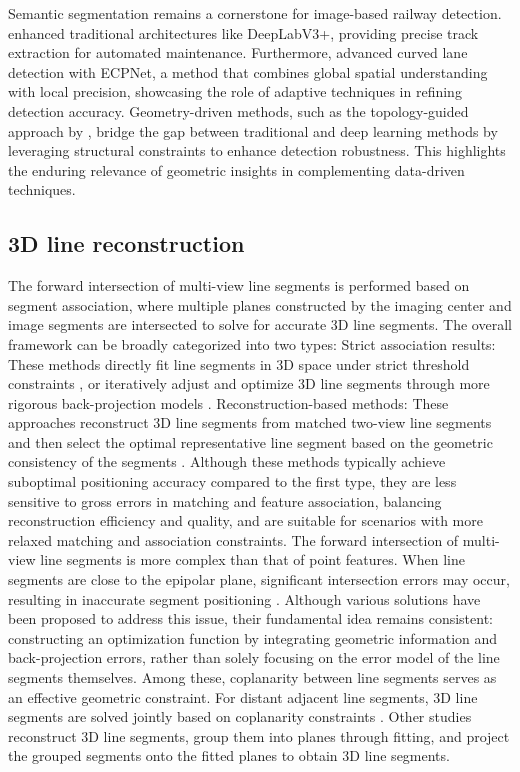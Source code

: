 Semantic segmentation remains a cornerstone for image-based railway detection.
\cite{Weng2023} enhanced traditional architectures like DeepLabV3+, providing precise track extraction for automated maintenance. Furthermore,
\cite{zhang2024enhanced} advanced curved lane detection with ECPNet, a method that combines global spatial understanding with local precision, showcasing the role of adaptive techniques in refining detection accuracy.
Geometry-driven methods, such as the topology-guided approach by \cite{Yang2022a}, bridge the gap between traditional and deep learning methods by leveraging structural constraints to enhance detection robustness. 
This highlights the enduring relevance of geometric insights in complementing data-driven techniques.

\subsection{3D line reconstruction}
The forward intersection of multi-view line segments is performed based on segment association, where multiple planes constructed by the imaging center and image segments are intersected to solve for accurate 3D line segments. The overall framework can be broadly categorized into two types:
Strict association results: These methods directly fit line segments in 3D space under strict threshold constraints \citep{Jain2010}, or iteratively adjust and optimize 3D line segments through more rigorous back-projection models \citep{Schmid1997, HOFER, LiuCVPR}.
Reconstruction-based methods: These approaches reconstruct 3D line segments from matched two-view line segments and then select the optimal representative line segment based on the geometric consistency of the segments \citep{WEI2022}. Although these methods typically achieve suboptimal positioning accuracy compared to the first type, they are less sensitive to gross errors in matching and feature association, balancing reconstruction efficiency and quality, and are suitable for scenarios with more relaxed matching and association constraints.
The forward intersection of multi-view line segments is more complex than that of point features. When line segments are close to the epipolar plane, significant intersection errors may occur, resulting in inaccurate segment positioning \citep{Hartley2003}. Although various solutions have been proposed to address this issue, their fundamental idea remains consistent: constructing an optimization function by integrating geometric information and back-projection errors, rather than solely focusing on the error model of the line segments themselves. Among these, coplanarity between line segments serves as an effective geometric constraint. For distant adjacent line segments, 3D line segments are solved jointly based on coplanarity constraints \citep{OK}. Other studies reconstruct 3D line segments, group them into planes through fitting, and project the grouped segments onto the fitted planes to obtain 3D line segments.

